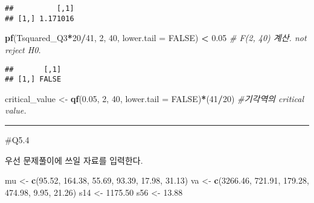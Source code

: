 \documentclass[
]{article}
\newenvironment{Shaded}{\begin{snugshade}}{\end{snugshade}}
\newcommand{\AttributeTok}[1]{\textcolor[rgb]{0.13,0.29,0.53}{#1}}
\newcommand{\CommentTok}[1]{\textcolor[rgb]{0.56,0.35,0.01}{\textit{#1}}}
\newcommand{\ConstantTok}[1]{\textcolor[rgb]{0.56,0.35,0.01}{#1}}
\newcommand{\DecValTok}[1]{\textcolor[rgb]{0.00,0.00,0.81}{#1}}
\newcommand{\FloatTok}[1]{\textcolor[rgb]{0.00,0.00,0.81}{#1}}
\newcommand{\FunctionTok}[1]{\textcolor[rgb]{0.13,0.29,0.53}{\textbf{#1}}}
\newcommand{\NormalTok}[1]{#1}
\newcommand{\OtherTok}[1]{\textcolor[rgb]{0.56,0.35,0.01}{#1}}
\newcommand{\SpecialCharTok}[1]{\textcolor[rgb]{0.81,0.36,0.00}{\textbf{#1}}}
\begin{document}
\begin{verbatim}
##          [,1]
## [1,] 1.171016
\end{verbatim}

\begin{Shaded}
\begin{Highlighting}[]
\FunctionTok{pf}\NormalTok{(Tsquared\_Q3}\SpecialCharTok{*}\DecValTok{20}\SpecialCharTok{/}\DecValTok{41}\NormalTok{, }\DecValTok{2}\NormalTok{, }\DecValTok{40}\NormalTok{, }\AttributeTok{lower.tail =} \ConstantTok{FALSE}\NormalTok{) }\SpecialCharTok{\textless{}} \FloatTok{0.05} \CommentTok{\# F(2, 40) 계산. not reject H0.}
\end{Highlighting}
\end{Shaded}

\begin{verbatim}
##       [,1]
## [1,] FALSE
\end{verbatim}

\begin{Shaded}
\begin{Highlighting}[]
\NormalTok{critical\_value }\OtherTok{\textless{}{-}} \FunctionTok{qf}\NormalTok{(}\FloatTok{0.05}\NormalTok{, }\DecValTok{2}\NormalTok{, }\DecValTok{40}\NormalTok{, }\AttributeTok{lower.tail =} \ConstantTok{FALSE}\NormalTok{)}\SpecialCharTok{*}\NormalTok{(}\DecValTok{41}\SpecialCharTok{/}\DecValTok{20}\NormalTok{) }\CommentTok{\#기각역의 critical value.}
\end{Highlighting}
\end{Shaded}

\begin{center}\rule{0.5\linewidth}{0.5pt}\end{center}

\#Q5.4

우선 문제풀이에 쓰일 자료를 입력한다.

\begin{Shaded}
\begin{Highlighting}[]
\NormalTok{mu }\OtherTok{\textless{}{-}} \FunctionTok{c}\NormalTok{(}\FloatTok{95.52}\NormalTok{, }\FloatTok{164.38}\NormalTok{, }\FloatTok{55.69}\NormalTok{, }\FloatTok{93.39}\NormalTok{, }\FloatTok{17.98}\NormalTok{, }\FloatTok{31.13}\NormalTok{)}
\NormalTok{va }\OtherTok{\textless{}{-}} \FunctionTok{c}\NormalTok{(}\FloatTok{3266.46}\NormalTok{, }\FloatTok{721.91}\NormalTok{, }\FloatTok{179.28}\NormalTok{, }\FloatTok{474.98}\NormalTok{, }\FloatTok{9.95}\NormalTok{, }\FloatTok{21.26}\NormalTok{)}
\NormalTok{s14 }\OtherTok{\textless{}{-}} \FloatTok{1175.50}
\NormalTok{s56 }\OtherTok{\textless{}{-}} \FloatTok{13.88}
\end{Highlighting}
\end{Shaded}
\end{document}
